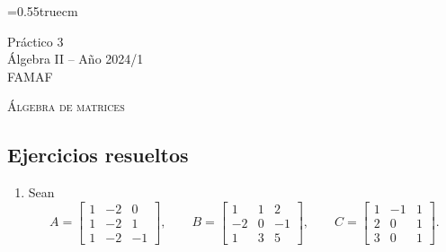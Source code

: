 \documentclass[a4paper,12pt,twoside,spanish,reqno]{amsbook}
\numberwithin{equation}{section}
\begin{document}
    \baselineskip=0.55truecm %
    
    
    {\bf \begin{center} Práctico 3 \\ Álgebra  II -- Año 2024/1 \\ FAMAF \end{center}}



\centerline{\textsc{\'Algebra de matrices}}
\subsection*{Ejercicios resueltos}

\begin{enumerate}[topsep=6pt,itemsep=6pt]


\item\label{ej} Sean
$$
A= \begin{bmatrix} 1&-2&0\\ 1&-2&1\\ 1&-2&-1\end{bmatrix},\quad
\quad B= \begin{bmatrix}1&1&2\\ -2&0&-1\\ 1&3&5 \end{bmatrix},
\quad\quad C=\begin{bmatrix}1&-1&1\\ 2&0&1\\ 3&0&1 \end{bmatrix}.
$$


\end{enumerate}
\end{document}
